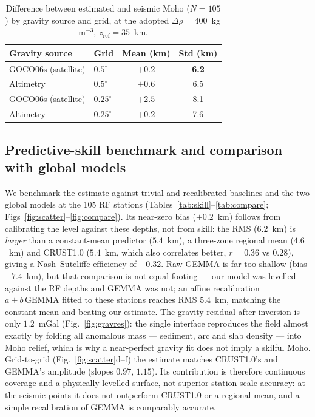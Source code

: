 \documentclass[extra,mreferee]{gji}
\begin{document}
\begin{table}
\caption{Difference between estimated and seismic Moho ($N=105$) by gravity source
and grid, at the adopted $\Delta\rho=400$~kg\,m$^{-3}$, $z_{\mathrm{ref}}=35$~km.}
\label{tab:res}
\begin{tabular}{llcc}
\hline
Gravity source & Grid & Mean (km) & Std (km)\\
\hline
{GOCO06s} (satellite) & $0.5^{\circ}$ & $+0.2$ & \textbf{6.2}\\
Altimetry & $0.5^{\circ}$ & $+0.6$ & 6.5\\
{GOCO06s} (satellite) & $0.25^{\circ}$ & $+2.5$ & 8.1\\
Altimetry & $0.25^{\circ}$ & $+0.2$ & 7.6\\
\hline
\end{tabular}
\end{table}

\subsection{Predictive-skill benchmark and comparison with global models}
We benchmark the estimate against trivial and recalibrated baselines and the two
global models at the 105 RF stations (Tables~\ref{tab:skill}--\ref{tab:compare};
Figs~\ref{fig:scatter}--\ref{fig:compare}). Its near-zero bias ($+0.2$~km) follows
from calibrating the level against these depths, not from skill: the RMS ($6.2$~km)
is \emph{larger} than a constant-mean predictor ($5.4$~km), a three-zone regional
mean ($4.6$~km) and {CRUST1.0} ($5.4$~km, which also correlates better, $r=0.36$ vs
$0.28$), giving a Nash--Sutcliffe efficiency of $-0.32$. Raw {GEMMA} is far too
shallow (bias $-7.4$~km), but that comparison is not equal-footing --- our model was
levelled against the RF depths and {GEMMA} was not; an affine recalibration
$a+b\,\mathrm{GEMMA}$ fitted to these stations reaches RMS $5.4$~km, matching the
constant mean and beating our estimate. The gravity residual after inversion is only
$1.2$~mGal (Fig.~\ref{fig:gravres}): the single interface reproduces the field almost
exactly by folding all anomalous mass --- sediment, arc and slab density --- into
Moho relief, which is why a near-perfect gravity fit does not imply a skilful Moho.
Grid-to-grid (Fig.~\ref{fig:scatter}d--f) the estimate matches {CRUST1.0}'s and
{GEMMA}'s amplitude (slopes $0.97$, $1.15$). Its contribution is therefore continuous
coverage and a physically levelled surface, not superior station-scale accuracy: at
the seismic points it does not outperform {CRUST1.0} or a regional mean, and a simple
recalibration of {GEMMA} is comparably accurate.
\end{document}

